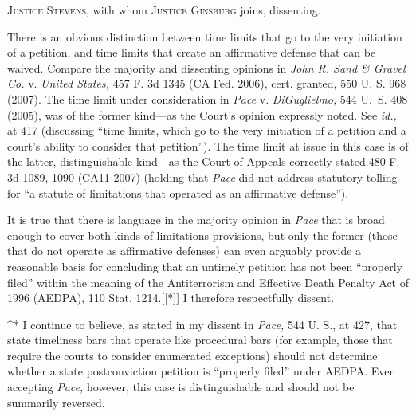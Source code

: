 
\setcounter{page}{8}

  \textsc{Justice Stevens,} with whom \textsc{Justice Ginsburg} joins, dissenting.

  There is an obvious distinction between time limits that go to
the very initiation of a petition, and time limits that create an
affirmative defense that can be waived. Compare the majority and
dissenting opinions in \emph{John R. Sand \& Gravel Co.} v. \emph{United
States,} 457 F. 3d 1345 (CA Fed. 2006), cert. granted, 550 U. S.
968 (2007). The time limit under consideration in \emph{Pace} v.
\emph{DiGuglielmo,} 544 U.~S. 408 (2005), was of the former kind---as
the Court's opinion expressly noted. See \emph{id.,} at 417 (discussing
``time limits, which go to the very initiation of a petition and a
court's ability to consider that petition''). The time limit at
issue in this case is of the latter, distinguishable kind---as the Court
of Appeals correctly stated.480 F. 3d 1089, 1090 (CA11 2007) (holding
that \emph{Pace} did not address statutory tolling for ``a statute of
limitations that operated as an affirmative defense'').

  It is true that there is language in the majority opinion in \emph{Pace}
that is broad enough to cover both kinds of limitations provisions, but
only the former (those that do not operate as affirmative defenses) can
even arguably provide a reasonable basis for concluding that an untimely
petition has not been ``properly filed'' within the meaning of the
Antiterrorism and Effective Death Penalty Act of 1996 (AEDPA), 110
Stat. 1214.[[*]] I therefore respectfully dissent.


^* I continue to believe, as stated in my dissent in \emph{Pace,} 544 U.
S., at 427, that state timeliness bars that operate like procedural
bars (for example, those that require the courts to consider enumerated
exceptions) should not determine whether a state postconviction petition
is ``properly filed'' under AEDPA. Even accepting \emph{Pace,} however,
this case is distinguishable and should not be summarily reversed.
